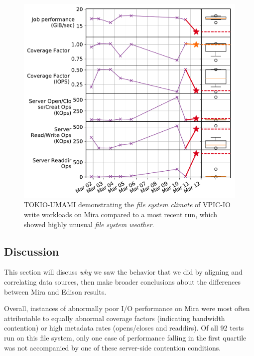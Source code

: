 \begin{figure}[t]
    \centering
    \includegraphics[width=1.0\columnwidth]{figs/umami-mira-fs1-vpic-write.pdf}
    \caption{TOKIO-UMAMI demonstrating the \emph{file system climate} of VPIC-IO write workloads
    on Mira compared to a most recent run, which showed
    highly unusual \emph{file system weather}.}
    \label{fig:umami-mira-fs1-vpic-write}
\end{figure}

\subsection{Discussion} \label{sec:results/discussion}

This section will discuss \emph{why} we saw the behavior that we did by
aligning and correlating data sources, then make broader conclusions about the
differences between Mira and Edison results.

Overall, instances of abnormally poor I/O performance on Mira were most often attributable to equally abnormal coverage factors (indicating bandwidth contention) or high metadata rates (opens/closes and readdirs).  Of all 92 tests run on this file system, only one case of performance falling in the first quartile was not accompanied by one of these server-side contention conditions.

